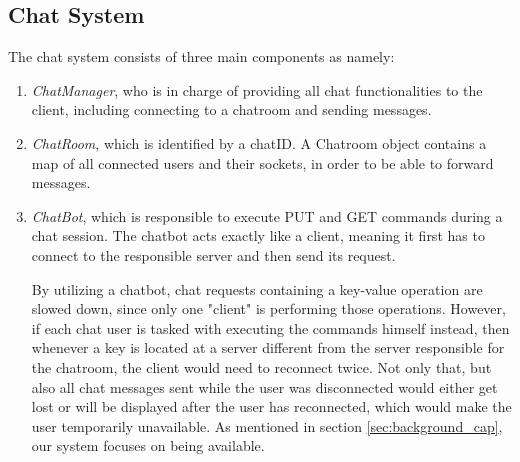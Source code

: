 \subsection{Chat System}
\label{sec:implementation_chatsystem}
The chat system consists of three main components as namely:
\begin{enumerate}
	\item \textit{ChatManager}, who is in charge of providing all chat functionalities to the client, including connecting to a chatroom and sending messages.
	\item \textit{ChatRoom}, which is identified by a chatID. A Chatroom object contains a map of all connected users and their sockets, in order to be able to forward messages.
	\item \textit{ChatBot}, which is responsible to execute PUT and GET commands during a chat session. The chatbot acts exactly like a client, meaning it first has to connect to the responsible server and then send its request.
	
By utilizing a chatbot, chat requests containing a key-value operation are slowed down, since only one "client" is performing those operations. However, if each chat user is tasked with executing the commands himself instead, then whenever a key is located at a server different from the server responsible for the chatroom, the client would need to reconnect twice. Not only that, but also all chat messages sent while the user was disconnected would either get lost or will be displayed after the user has reconnected, which would make the user temporarily unavailable. As mentioned in section \ref{sec:background_cap}, our system focuses on being available. 	

\end{enumerate}